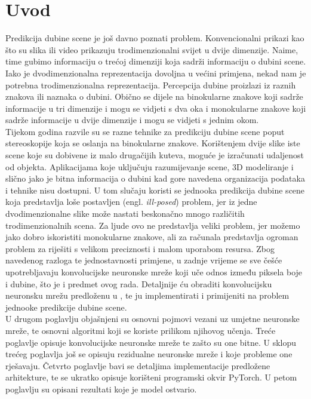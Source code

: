 \documentclass[times, utf8, zavrsni, numeric]{fer}
\begin{document}
\chapter{Uvod}
Predikcija dubine scene je još davno poznati problem. Konvencionalni
prikazi kao što su slika ili video prikazuju trodimenzionalni svijet u
dvije dimenzije. Naime, time gubimo informaciju o trećoj dimenziji koja
sadrži informaciju o dubini scene. Iako je dvodimenzionalna 
reprezentacija dovoljna u većini primjena, nekad nam je potrebna
trodimenzionalna reprezentacija. Percepcija dubine proizlazi iz
raznih znakova ili naznaka o dubini. Obično se dijele na binokularne 
znakove koji sadrže informacije u tri dimenzije i mogu se vidjeti s dva 
oka i monokularne znakove koji sadrže informacije u dvije dimenzije i 
mogu se vidjeti s jednim okom.\\\indent 
Tijekom godina razvile su se razne tehnike za predikciju dubine scene poput
stereoskopije koja se oslanja na binokularne znakove. Korištenjem dvije slike 
iste scene koje su dobivene iz malo drugačijih kuteva, moguće je izračunati 
udaljenost od objekta. Aplikacijama koje uključuju 
razumijevanje scene, 3D modeliranje i slično jako je bitna informacija o 
dubini kad gore navedena organizacija podataka i tehnike nisu dostupni.
U tom slučaju koristi se jednooka predikcija dubine scene koja predstavlja 
loše postavljen (engl. \textit{ill-posed}) problem, jer iz jedne dvodimenzionalne slike 
može nastati beskonačno mnogo različitih trodimenzionalnih scena. Za ljude 
ovo ne predstavlja veliki problem, jer možemo jako dobro iskoristiti 
monokularne znakove, ali za računala predstavlja ogroman problem za riješiti 
s velikom preciznosti i malom uporabom resursa.
Zbog navedenog razloga te jednostavnosti primjene, u zadnje vrijeme se sve
češće upotrebljavaju konvolucijske
neuronske mreže koji uče odnos između piksela boje i dubine, što je i predmet ovog
rada. Detaljnije ću obraditi konvolucijsku neuronsku mrežu predloženu u 
\cite{DBLP:journals/corr/LainaRBTN16}, te ju implementirati i primijeniti na
 problem jednooke predikcije dubine scene.\\\indent
U drugom poglavlju objašnjeni su osnovni pojmovi vezani uz umjetne neuronske
mreže, te osnovni algoritmi koji se koriste prilikom njihovog učenja. Treće
poglavlje opisuje konvolucijske neuronske mreže te zašto su one bitne. U sklopu
trećeg poglavlja još se opisuju rezidualne neuronske mreže i koje probleme
one rješavaju. Četvrto poglavlje bavi se detaljima implementacije predložene
arhitekture, te se ukratko opisuje korišteni programski okvir PyTorch.
U petom poglavlju su opisani rezultati koje je model ostvario.
\end{document}
